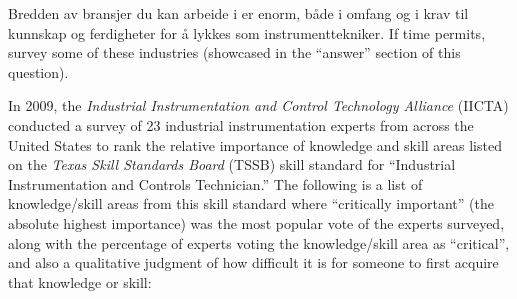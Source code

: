 
Bredden av bransjer du kan arbeide i er enorm, både i omfang og i krav til kunnskap og ferdigheter for å lykkes som instrumenttekniker.  If time permits, survey some of these industries (showcased in the ``answer'' section of this question).

\vskip 10pt

In 2009, the {\it Industrial Instrumentation and Control Technology Alliance} (IICTA) conducted a survey of 23 industrial instrumentation experts from across the United States to rank the relative importance of knowledge and skill areas listed on the {\it Texas Skill Standards Board} (TSSB) skill standard for ``Industrial Instrumentation and Controls Technician.''  The following is a list of knowledge/skill areas from this skill standard where ``critically important'' (the absolute highest importance) was the most popular vote of the experts surveyed, along with the percentage of experts voting the knowledge/skill area as ``critical'', and also a qualitative judgment of how difficult it is for someone to first acquire that knowledge or skill:



